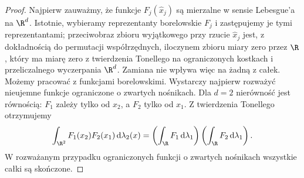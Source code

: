 \begin{proof}
Najpierw zauważmy, że funkcje $F_j(\widehat x_j)$
są mierzalne w sensie Lebesgue'a na $\R^d$.
Istotnie, wybieramy reprezentanty borelowskie $F_j$
i zastępujemy je tymi reprezentantami; przeciwobraz
zbioru wyjątkowego przy rzucie $\widehat x_j$
jest, z dokładnością do permutacji współrzędnych,
iloczynem zbioru miary zero przez $\R$, który ma
miarę zero z twierdzenia Tonellego na ograniczonych
kostkach i przeliczalnego wyczerpania $\R^d$.
Zamiana nie wpływa więc na żadną z całek.
Możemy pracować z funkcjami borelowskimi.
Wystarczy najpierw rozważyć nieujemne funkcje ograniczone
o zwartych nośnikach. Dla $d=2$ nierówność jest równością:
$F_1$ zależy tylko od $x_2$, a $F_2$ tylko od $x_1$.
Z twierdzenia Tonellego otrzymujemy
\[
 \int_{\R^2}F_1(x_2)F_2(x_1)\,\mathrm d\lambda_2(x)
 =\left(\int_\R F_1\,\mathrm d\lambda_1\right)
  \left(\int_\R F_2\,\mathrm d\lambda_1\right).
\]
W rozważanym przypadku ograniczonych funkcji o zwartych
nośnikach wszystkie całki są skończone.


\end{proof}
